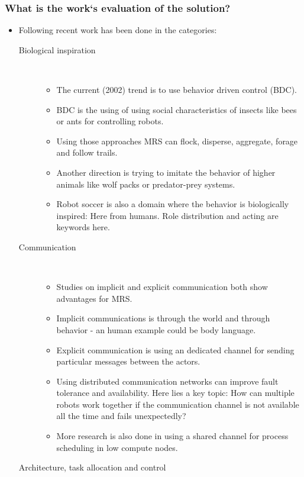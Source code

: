 \documentclass{article}
\begin{document}
\subsubsection*{What is the work`s evaluation of the solution?}
\begin{itemize}
    \item Following recent work has been done in the categories: \
    \begin{description}
        \item[Biological inspiration] \ 
        \begin{itemize} 
            \item The current (2002) trend is to use behavior driven control (BDC).
            \item BDC is the using of using social characteristics of insects like bees or ants for controlling robots.
            \item Using those approaches MRS can flock, disperse, aggregate, forage and follow trails.
            \item Another direction is trying to imitate the behavior of higher animals like wolf packs or predator-prey systems.
            \item Robot soccer is also a domain where the behavior is biologically inspired: Here from humans. Role distribution and acting are keywords here.
        \end{itemize}
        \item[Communication] \ 
        \begin{itemize} 
            \item Studies on implicit and explicit communication both show advantages for MRS. 
            \item Implicit communications is through the world and through behavior - an human example could be body language.
            \item Explicit communication is using an dedicated channel for sending particular messages between the actors.
            \item Using distributed communication networks can improve fault tolerance and availability. Here lies a key topic: How can multiple robots work together if the communication channel is not available all the time and fails unexpectedly?
            \item More research is also done in using a shared channel for process scheduling in low compute nodes.
        \end{itemize}
        \item[Architecture, task allocation and control] \ 

\end{description}
\end{itemize}
\end{document}
